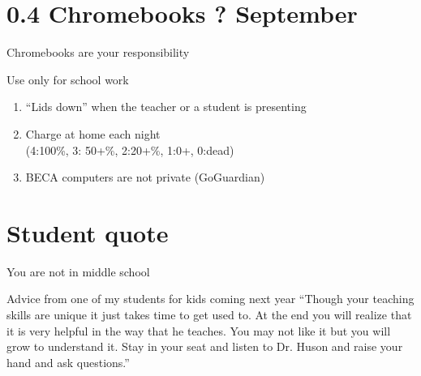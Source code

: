 \documentclass[onlytextwidth]{beamer}
\begin{document}
\section{0.4 Chromebooks \hfill ? September}
\begin{frame}{Chromebooks are your responsibility}
  \begin{block}{Use only for school work}
    \begin{enumerate}
      \item ``Lids down'' when the teacher or a student is presenting
      \item Charge at home each night\\
        (4:100\%, 3: 50+\%, 2:20+\%, 1:0+, 0:dead)
      \item BECA computers are not private (GoGuardian)
    \end{enumerate}
    \end{block}
  \end{frame}

\section{Student quote}
\begin{frame}{You are not in middle school}
  \begin{block}{Advice from one of my students for kids coming next year}\vspace{0.5cm}
    ``Though your teaching skills are unique it just takes time to get used to. At the end you will realize that it is very helpful in the way that he teaches. You may not like it but you will grow to understand it. Stay in your seat and listen to Dr. Huson and raise your hand and ask questions.''
  \end{block}
  \end{frame}
\end{document}
